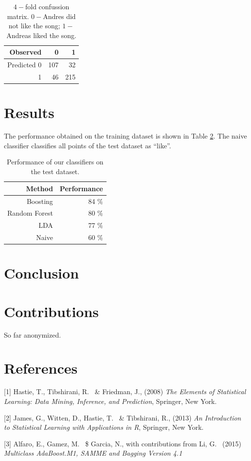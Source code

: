 \documentclass{article}
\begin{document}
\begin {table}[h]
\begin{center}
\begin{tabular}{r|r|r}
  Observed & 0  & 1 \\
  \hline			
  Predicted 0 & 107 & 32 \\
  1 & 46 & 215 \\ 
\end{tabular}
\end{center}
\caption {$4-$fold confussion matrix. $0-$Andres did not like the song; $1-$Andreas liked the song.} 
\label{tab:confussion_matrix} 
\end {table}

\section{Results}

The performance obtained on the training dataset is shown in Table \ref{tab:performance}.
The naive classifier classifies all points of the test dataset as ``like''.

\begin {table}[h]
\begin{center}
\begin{tabular}{r|r}
  Method & Performance   \\
  \hline			
  Boosting & 84 \% \\
  Random Forest & 80 \% \\
  LDA & 77 \% \\
  Naive & 60 \%
\end{tabular}
\end{center}
\caption {Performance of our classifiers on the test dataset.} 
\label{tab:performance} 
\end {table}

\section{Conclusion}

\section{Contributions}

So far anonymized.

\section*{References}

\small

[1] Hastie, T., Tibshirani, R. \ \& Friedman, J., (2008) {\it The Elements of Statistical Learning: Data Mining, Inference, and Prediction}, Springer, New York.

[2] James, G., Witten, D., Hastie, T. \ \& Tibshirani, R., (2013) {\it An Introduction to Statistical Learning
with Applications in R}, Springer, New York.

[3] Alfaro, E., Gamez, M. \ \$ Garcia, N., with contributions from Li, G. \ (2015) {\it Multiclass AdaBoost.M1, SAMME and Bagging Version 4.1}
\end{document}
